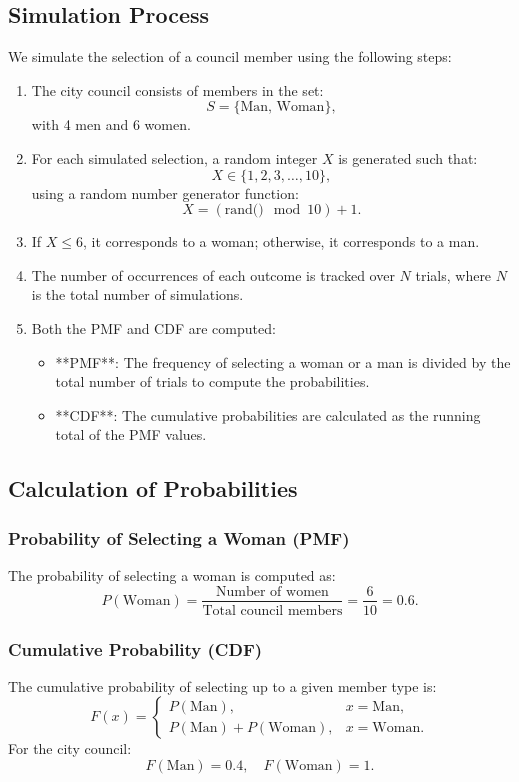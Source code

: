 \documentclass[journal]{IEEEtran}
\begin{document}
\subsection*{Simulation Process}
We simulate the selection of a council member using the following steps:
\begin{enumerate}
    \item The city council consists of members in the set:
    \[
    S = \{\text{Man, Woman}\},
    \]
    with 4 men and 6 women.
    \item For each simulated selection, a random integer \( X \) is generated such that:
    \[
    X \in \{1, 2, 3, \dots, 10\},
    \]
    using a random number generator function:
    \[
    X = (\text{rand()} \mod 10) + 1.
    \]
    \item If \( X \leq 6 \), it corresponds to a woman; otherwise, it corresponds to a man.
    \item The number of occurrences of each outcome is tracked over \( N \) trials, where \( N \) is the total number of simulations.
    \item Both the PMF and CDF are computed:
    \begin{itemize}
        \item **PMF**: The frequency of selecting a woman or a man is divided by the total number of trials to compute the probabilities.
        \item **CDF**: The cumulative probabilities are calculated as the running total of the PMF values.
    \end{itemize}
\end{enumerate}

\subsection*{Calculation of Probabilities}
\subsubsection*{Probability of Selecting a Woman (PMF)}
The probability of selecting a woman is computed as:
\[
P(\text{Woman}) = \frac{\text{Number of women}}{\text{Total council members}} = \frac{6}{10} = 0.6.
\]

\subsubsection*{Cumulative Probability (CDF)}
The cumulative probability of selecting up to a given member type is:
\[
F(x) = 
\begin{cases} 
P(\text{Man}), & x = \text{Man}, \\ 
P(\text{Man}) + P(\text{Woman}), & x = \text{Woman}.
\end{cases}
\]
For the city council:
\[
F(\text{Man}) = 0.4, \quad F(\text{Woman}) = 1.
\]
\end{document}
